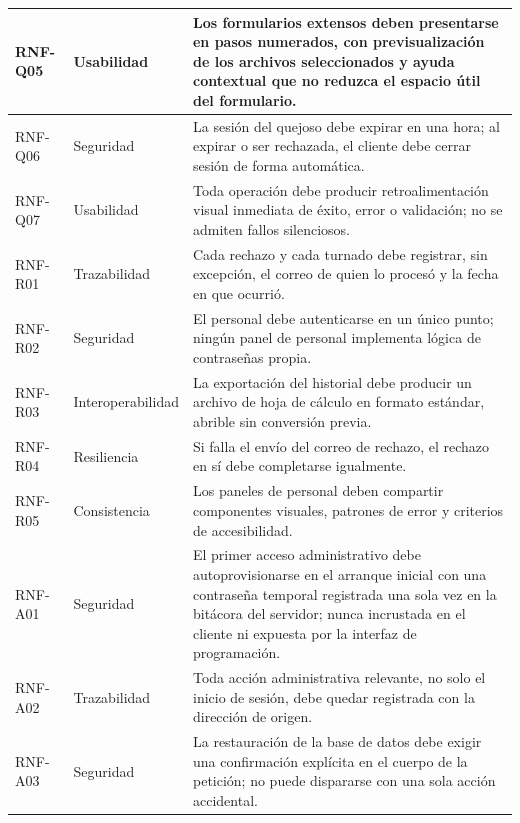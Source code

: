 \begin{longtable}{|p{1.7cm}|p{2.7cm}|p{9.7cm}|}
		RNF-Q05 & Usabilidad & Los formularios extensos deben presentarse en pasos numerados, con
		previsualización de los archivos seleccionados y ayuda contextual que no reduzca el espacio
		útil del formulario. \\ \hline
	
		RNF-Q06 & Seguridad & La sesión del quejoso debe expirar en una hora; al expirar o ser
		rechazada, el cliente debe cerrar sesión de forma automática. \\ \hline
	
		RNF-Q07 & Usabilidad & Toda operación debe producir retroalimentación visual inmediata de
		éxito, error o validación; no se admiten fallos silenciosos. \\ \hline
	
		RNF-R01 & Trazabilidad & Cada rechazo y cada turnado debe registrar, sin excepción, el
		correo de quien lo procesó y la fecha en que ocurrió. \\ \hline
	
		RNF-R02 & Seguridad & El personal debe autenticarse en un único punto; ningún panel de
		personal implementa lógica de contraseñas propia. \\ \hline
	
		RNF-R03 & Interoperabilidad & La exportación del historial debe producir un archivo de hoja
		de cálculo en formato estándar, abrible sin conversión previa. \\ \hline
	
		RNF-R04 & Resiliencia & Si falla el envío del correo de rechazo, el rechazo en sí debe
		completarse igualmente. \\ \hline
	
		RNF-R05 & Consistencia & Los paneles de personal deben compartir componentes visuales,
		patrones de error y criterios de accesibilidad. \\ \hline
	
		RNF-A01 & Seguridad & El primer acceso administrativo debe autoprovisionarse en el arranque
		inicial con una contraseña temporal registrada una sola vez en la bitácora del servidor;
		nunca incrustada en el cliente ni expuesta por la interfaz de programación. \\ \hline
	
		RNF-A02 & Trazabilidad & Toda acción administrativa relevante, no solo el inicio de sesión,
		debe quedar registrada con la dirección de origen. \\ \hline
	
		RNF-A03 & Seguridad & La restauración de la base de datos debe exigir una confirmación
		explícita en el cuerpo de la petición; no puede dispararse con una sola acción accidental.
		\\ \hline
	

\end{longtable}

